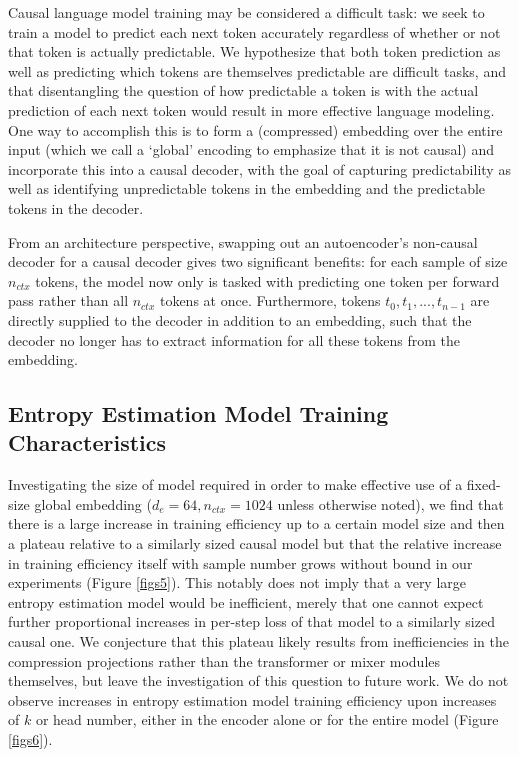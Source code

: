 \documentclass{article}
\begin{document}
    Causal language model training may be considered a difficult task: we seek to train a model to predict each next token accurately regardless of whether or not that token is actually predictable. We hypothesize that both token prediction as well as predicting which tokens are themselves predictable are difficult tasks, and that disentangling the question of how predictable a token is with the actual prediction of each next token would result in more effective language modeling. One way to accomplish this is to form a (compressed) embedding over the entire input (which we call a `global' encoding to emphasize that it is not causal) and incorporate this into a causal decoder, with the goal of capturing predictability as well as identifying unpredictable tokens in the embedding and the predictable tokens in the decoder. 
    
    From an architecture perspective, swapping out an autoencoder's non-causal decoder for a causal decoder gives two significant benefits: for each sample of size $n_{ctx}$ tokens, the model now only is tasked with predicting one token per forward pass rather than all $n_{ctx}$ tokens at once. Furthermore, tokens $t_0, t_1, ..., t_{n-1}$ are directly supplied to the decoder in addition to an embedding, such that the decoder no longer has to extract information for all these tokens from the embedding.

    \subsection{Entropy Estimation Model Training Characteristics}

    Investigating the size of model required in order to make effective use of a fixed-size global embedding ($d_e=64, n_{ctx}=1024$ unless otherwise noted), we find that there is a large increase in training efficiency up to a certain model size and then a plateau relative to a similarly sized causal model but that the relative increase in training efficiency itself with sample number grows without bound in our experiments (Figure \ref{figs5}). This notably does not imply that a very large entropy estimation model would be inefficient, merely that one cannot expect further proportional increases in per-step loss of that model to a similarly sized causal one. We conjecture that this plateau likely results from inefficiencies in the compression projections rather than the transformer or mixer modules themselves, but leave the investigation of this question to future work. We do not observe increases in entropy estimation model training efficiency upon increases of $k$ or head number, either in the encoder alone or for the entire model (Figure \ref{figs6}).
\end{document}
